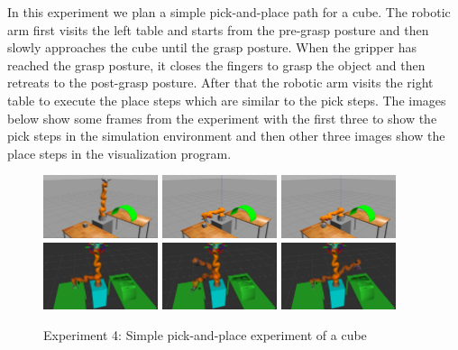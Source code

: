 In this experiment we plan a simple pick-and-place path for a cube. The robotic arm first visits the left table and starts from the pre-grasp posture and then 
slowly approaches the cube until the grasp posture. When the gripper has reached the grasp posture, it closes the fingers to grasp the object and then retreats 
to the post-grasp posture. After that the robotic arm visits the right table to execute the place steps which are similar to the pick steps. The images below 
show some frames from the experiment with the first three to show the pick steps in the simulation environment and then other three images show the place steps 
in the visualization program.

\begin{center}
\begin{figure}[H]
\centering
\includegraphics[width=0.3\textwidth]{images/robot_planner4/robot_planner4_1}
\includegraphics[width=0.3\textwidth]{images/robot_planner4/robot_planner4_3}
\includegraphics[width=0.3\textwidth]{images/robot_planner4/robot_planner4_5}\\
\includegraphics[width=0.3\textwidth]{images/robot_planner4/robot_planner4_6}
\includegraphics[width=0.3\textwidth]{images/robot_planner4/robot_planner4_8}
\includegraphics[width=0.3\textwidth]{images/robot_planner4/robot_planner4_10}\\
\caption{Experiment 4: Simple pick-and-place experiment of a cube}
\end{figure}
\end{center}

